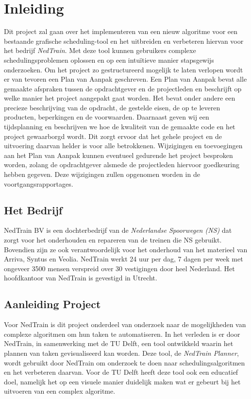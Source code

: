 \section{Inleiding}
Dit project zal gaan over het implementeren van een nieuw algoritme voor een bestaande grafische scheduling-tool en het uitbreiden en verbeteren hiervan voor het bedrijf \emph{NedTrain}. Met deze tool kunnen gebruikers complexe schedulingsproblemen oplossen en op een intu\"itieve manier stapsgewijs onderzoeken. Om het project zo gestructureerd mogelijk te laten verlopen wordt er van tevoren een Plan van Aanpak geschreven. Een Plan van Aanpak bevat alle gemaakte afspraken tussen de opdrachtgever en de projectleden en beschrijft op welke manier het project aangepakt gaat worden. Het bevat onder andere een precieze beschrijving van de opdracht, de gestelde eisen, de op te leveren producten, beperkingen en de voorwaarden. Daarnaast geven wij een tijdsplanning en beschrijven we hoe de kwaliteit van de gemaakte code en het project gewaarborgd wordt. Dit zorgt ervoor dat het gehele project en de uitvoering daarvan helder is voor alle betrokkenen. Wijzigingen en toevoegingen aan het Plan van Aanpak kunnen eventueel gedurende het project besproken worden, zolang de opdrachtgever alsmede de projectleden hiervoor goedkeuring hebben gegeven. Deze wijzigingen zullen opgenomen worden in de voortgangsrapportages.

\subsection{Het Bedrijf}
NedTrain BV is een dochterbedrijf van de \emph{Nederlandse Spoorwegen (NS)} dat zorgt voor het onderhouden en repareren van de treinen die NS gebruikt. \cite{NedTrainSite} Bovendien zijn ze ook verantwoordelijk voor het onderhoud van het materieel van Arriva, Syntus en Veolia. NedTrain werkt 24 uur per dag, 7 dagen per week met ongeveer 3500 mensen verspreid over 30 vestigingen door heel Nederland. Het hoofdkantoor van NedTrain is gevestigd in Utrecht.

\subsection{Aanleiding Project}
Voor NedTrain is dit project onderdeel van onderzoek naar de mogelijkheden van complexe algoritmen om hun taken te automatiseren. In het verleden is er door NedTrain, in samenwerking met de TU Delft, een tool ontwikkeld waarin het plannen van taken gevisualiseerd kan worden. Deze tool, de \emph{NedTrain Planner}, wordt gebruikt door NedTrain om onderzoek te doen naar schedulingsalgoritmen en het verbeteren daarvan. Voor de TU Delft heeft deze tool ook een educatief doel, namelijk het op een visuele manier duidelijk maken wat er gebeurt bij het uitvoeren van een complex algoritme.

